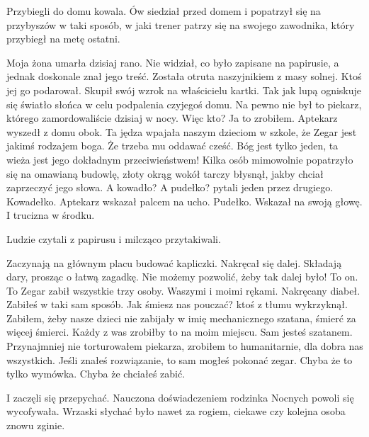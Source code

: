 Przybiegli do domu kowala.
Ów siedział przed domem i popatrzył się na przybyszów w taki sposób, w jaki trener patrzy się na swojego zawodnika, który przybiegł na metę ostatni.
\begin{dialogue}
	\ds{} Moja żona umarła dzisiaj rano. \dm{} 
		Nie widział, co było zapisane na papirusie, a jednak doskonale znał jego treść. \dm{} 
		Została otruta naszyjnikiem z masy solnej. Ktoś jej go podarował. \dm{}
		Skupił swój wzrok na właścicielu kartki. Tak jak lupą ogniskuje się światło słońca w celu podpalenia czyjegoś domu. \dm{} 
		Na pewno nie był to piekarz, którego zamordowaliście dzisiaj w nocy. Więc kto?
	\ds{} Ja to zrobiłem. \dm{} 
		Aptekarz wyszedł z domu obok. \dm{} 
		Ta jędza wpajała naszym dzieciom w szkole, że Zegar jest jakimś rodzajem boga. Że trzeba mu oddawać cześć. Bóg jest tylko jeden, ta wieża jest jego dokładnym przeciwieństwem! \dm{} 
		Kilka osób mimowolnie popatrzyło się na omawianą budowlę, złoty okrąg wokół tarczy błysnął, jakby chciał zaprzeczyć jego słowa.
	\ds{} A kowadło? A pudełko? \dm{} 
		pytali jeden przez drugiego.
	\ds{} Kowadełko. \dm{} Aptekarz wskazał palcem na ucho. \dm{} Pudełko. \dm{} Wskazał na swoją głowę. \dm{} I trucizna w środku.
\end{dialogue}
Ludzie czytali z papirusu i milcząco przytakiwali.
\begin{dialogue}
	\ds{} Zaczynają na głównym placu budować kapliczki. \dm{} 
		Nakręcał się dalej. \dm{}
		Składają dary, prosząc o łatwą zagadkę. Nie możemy pozwolić, żeby tak dalej było! To on. To Zegar zabił wszystkie trzy osoby. Waszymi i moimi rękami. Nakręcany diabeł.
	\ds{} Zabiłeś w taki sam sposób. Jak śmiesz nas pouczać? \dm{} 
		ktoś z tłumu wykrzyknął.
	\ds{} Zabiłem, żeby nasze dzieci nie zabijały w imię mechanicznego szatana, śmierć za więcej śmierci. Każdy z was zrobiłby to na moim miejscu.
	\ds{} Sam jesteś szatanem. 
	\ds{} Przynajmniej nie torturowałem piekarza, zrobiłem to humanitarnie, dla dobra nas wszystkich.
	\ds{} Jeśli znałeś rozwiązanie, to sam mogłeś pokonać zegar. Chyba że to tylko wymówka. Chyba że chciałeś zabić.
\end{dialogue}
I zaczęli się przepychać.
Nauczona doświadczeniem rodzinka Nocnych powoli się wycofywała.
Wrzaski słychać było nawet za rogiem, ciekawe czy kolejna osoba znowu zginie.

